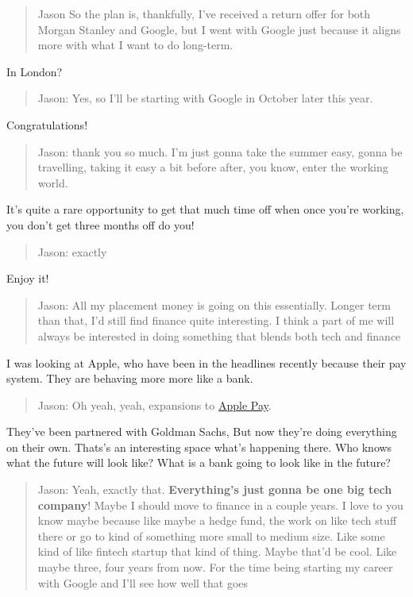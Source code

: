 \documentclass[
]{book}
\begin{document}
\begin{quote}
Jason So the plan is, thankfully, I've received a return offer for both Morgan Stanley and Google, but I went with Google just because it aligns more with what I want to do long-term.
\end{quote}

In London?

\begin{quote}
Jason: Yes, so I'll be starting with Google in October later this year.
\end{quote}

Congratulations!

\begin{quote}
Jason: thank you so much. I'm just gonna take the summer easy, gonna be travelling, taking it easy a bit before after, you know, enter the working world.
\end{quote}

It's quite a rare opportunity to get that much time off when once you're working, you don't get three months off do you!

\begin{quote}
Jason: exactly
\end{quote}

Enjoy it!

\begin{quote}
Jason: All my placement money is going on this essentially. Longer term than that, I'd still find finance quite interesting. I think a part of me will always be interested in doing something that blends both tech and finance
\end{quote}

I was looking at Apple, who have been in the headlines recently because their pay system. They are behaving more more like a bank. \citep{applegoldman}

\begin{quote}
Jason: Oh yeah, yeah, expansions to \href{https://en.wikipedia.org/wiki/Apple_Pay}{Apple Pay}.
\end{quote}

They've been partnered with Goldman Sachs, But now they're doing everything on their own. Thats's an interesting space what's happening there. Who knows what the future will look like? What is a bank going to look like in the future?

\begin{quote}
Jason: Yeah, exactly that. \textbf{Everything's just gonna be one big tech company}! Maybe I should move to finance in a couple years. I love to you know maybe because like maybe a hedge fund, the work on like tech stuff there or go to kind of something more small to medium size. Like some kind of like fintech startup that kind of thing. Maybe that'd be cool. Like maybe three, four years from now. For the time being starting my career with Google and I'll see how well that goes
\end{quote}
\end{document}
